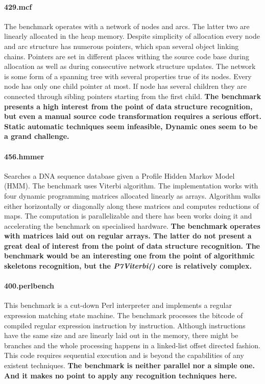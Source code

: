 \documentclass[10pt,a4paper]{report}
\begin{document}
\paragraph{429.mcf} The benchmark operates with a network of nodes and arcs. The latter two are linearly allocated in the heap memory. Despite simplicity of allocation every node and arc structure has numerous pointers, which span several object linking chains. Pointers are set in different places withing the source code base during allocation as well as during consecutive network structure updates. The network is some form of a spanning tree with several properties true of its nodes. Every node has only one child pointer at most. If node has several children they are connected through sibling pointers starting from the first child.\newline\null
\quad\textbf{The benchmark presents a high interest from the point of data structure recognition, but even a manual source code transformation requires a serious effort. Static automatic techniques seem infeasible, Dynamic ones seem to be a grand challenge.}

\paragraph{456.hmmer} Searches a DNA sequence database given a Profile Hidden Markov Model (HMM). The benchmark uses Viterbi algorithm. The implementation works with four dynamic programming matrices allocated linearly as arrays. Algorithm walks either horizontally or diagonally along these matrices and computes reductions of maps. The computation is parallelizable and there has been works doing it \cite{Ganesan:2010:AHG:1854776.1854844}\cite{inria} and accelerating the benchmark on specialised hardware.\newline\null
\quad\textbf{The benchmark operates with matrices laid out on regular arrays. The latter do not present a great deal of interest from the point of data structure recognition. The benchmark would be an interesting one from the point of algorithmic skeletons recognition, but the \textit{P7Viterbi()} core is relatively complex.}

\paragraph{400.perlbench} This benchmark is a cut-down Perl interpreter and implements a regular expression matching state machine. The benchmark processes the bitcode of compiled regular expression instruction by instruction. Although instructions have the same size and are linearly laid out in the memory, there might be branches and the whole processing happens in a linked-list offset directed fashion. This code requires sequential execution and is beyond the capabilities of any existent techniques.
\quad\textbf{The benchmark is neither parallel nor a simple one. And it makes no point to apply any recognition techniques here.}
\end{document}
